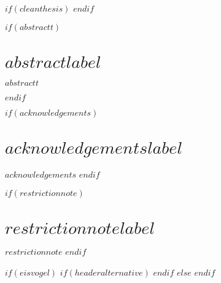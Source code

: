 
$if(cleanthesis)$
\clearpage
\customtitlebackpage
$endif$



$if(abstractt)$
\cleardoublepage
\begin{minipage}{\linewidth}

	\chapter*{$abstractlabel$}
	$abstractt$

\end{minipage}
\cleardoublepage
$endif$



$if(acknowledgements)$
\chapter*{$acknowledgementslabel$}
$acknowledgements$
$endif$



$if(restrictionnote)$
\chapter*{$restrictionnotelabel$}
$restrictionnote$
$endif$



\cleardoublepage



$if(eisvogel)$
$if(headeralternative)$
\pagestyle{headeralternative}
$endif$
$else$
\pagestyle{simple}
$endif$
